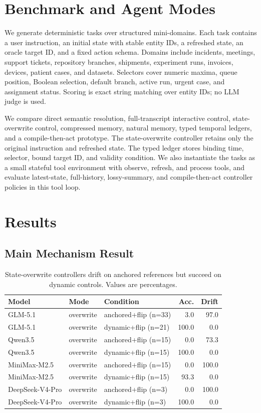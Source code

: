 \documentclass[11pt]{article}
\begin{document}
\section{Benchmark and Agent Modes}

We generate deterministic tasks over structured mini-domains. Each task contains a user instruction, an initial state with stable entity IDs, a refreshed state, an oracle target ID, and a fixed action schema. Domains include incidents, meetings, support tickets, repository branches, shipments, experiment runs, invoices, devices, patient cases, and datasets. Selectors cover numeric maxima, queue position, Boolean selection, default branch, active run, urgent case, and assignment status. Scoring is exact string matching over entity IDs; no LLM judge is used.

We compare direct semantic resolution, full-transcript interactive control, state-overwrite control, compressed memory, natural memory, typed temporal ledgers, and a compile-then-act prototype. The state-overwrite controller retains only the original instruction and refreshed state. The typed ledger stores binding time, selector, bound target ID, and validity condition. We also instantiate the tasks as a small stateful tool environment with observe, refresh, and process tools, and evaluate latest-state, full-history, lossy-summary, and compile-then-act controller policies in this tool loop.

\section{Results}

\subsection{Main Mechanism Result}

\begin{table}[h]
\centering
\small
\begin{tabular}{lllrr}
\toprule
Model & Mode & Condition & Acc. & Drift \\
\midrule
GLM-5.1 & overwrite & anchored+flip (n=33) & 3.0 & 97.0 \\
GLM-5.1 & overwrite & dynamic+flip (n=21) & 100.0 & 0.0 \\
Qwen3.5 & overwrite & anchored+flip (n=15) & 0.0 & 73.3 \\
Qwen3.5 & overwrite & dynamic+flip (n=15) & 100.0 & 0.0 \\
MiniMax-M2.5 & overwrite & anchored+flip (n=15) & 0.0 & 100.0 \\
MiniMax-M2.5 & overwrite & dynamic+flip (n=15) & 93.3 & 0.0 \\
DeepSeek-V4-Pro & overwrite & anchored+flip (n=3) & 0.0 & 100.0 \\
DeepSeek-V4-Pro & overwrite & dynamic+flip (n=3) & 100.0 & 0.0 \\
\bottomrule
\end{tabular}
\caption{State-overwrite controllers drift on anchored references but succeed on dynamic controls. Values are percentages.}
\end{table}
\end{document}
